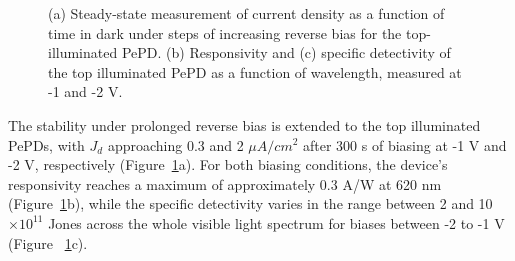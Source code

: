 \begin{figure}[htbp]
\begin{subfigure}[t]{0.44\textwidth}
    \end{subfigure}

    \caption{(a) Steady-state measurement of current density as a function of time in dark under steps of increasing reverse bias for the top-illuminated PePD. (b) Responsivity and (c) specific detectivity of the top illuminated PePD as a function of wavelength, measured at -1 and -2 V. }
    \label{fig:etl:top_illuminated_stability_detectivity}
\end{figure}

The stability under prolonged reverse bias is extended to the top illuminated PePDs, with
$J_d$ approaching 0.3 and 2 $\mu A/cm^2$ after 300 s of biasing at -1 V and -2 V, respectively (Figure~\ref{fig:etl:top_illuminated_stability_detectivity}a). For both biasing conditions, the device's responsivity reaches a maximum of approximately 0.3 A/W at 620 nm (Figure~\ref{fig:etl:top_illuminated_stability_detectivity}b), while the specific detectivity varies in the range between 2 and 10 $\times 10^{11}$ Jones across the whole visible light spectrum for biases between -2 to -1 V (Figure ~\ref{fig:etl:top_illuminated_stability_detectivity}c).



